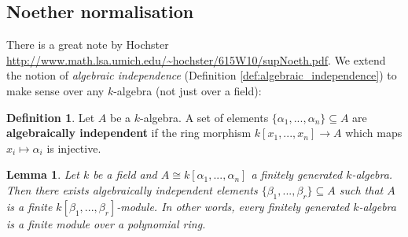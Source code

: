 \documentclass[12pt]{article}
\theoremstyle{plain}
\newtheorem{lemma}[thm]{Lemma}
\theoremstyle{definition}
\newtheorem{defn}[thm]{Definition} %
\newcommand{\lto}{\longrightarrow}
\begin{document}
\subsection{Noether normalisation}
There is a great note by Hochster \url{http://www.math.lsa.umich.edu/~hochster/615W10/supNoeth.pdf}.
%
We extend the notion of \emph{algebraic independence} (Definition \ref{def:algebraic_independence}) to make sense over any $k$-algebra (not just over a field):
\begin{defn}
Let $A$ be a $k$-algebra. A set of elements $\lbrace \alpha_1,...,\alpha_n \rbrace \subseteq A$ are \textbf{algebraically independent} if the ring morphism $k[x_1,...,x_n] \lto A$ which maps $x_i \mapsto \alpha_i$ is injective.
\end{defn}
%
\begin{lemma}
\label{lem:noether_normalisation}
Let $k$ be a field and $A\cong k[\alpha_1,...,\alpha_n]$ a finitely generated $k$-algebra. Then there exists algebraically independent elements $\lbrace \beta_1,...,\beta_r\rbrace \subseteq A$ such that $A$ is a finite $k[\beta_1,...,\beta_r]$-module. In other words, every finitely generated $k$-algebra is a finite module over a polynomial ring.
\end{lemma}
\end{document}
